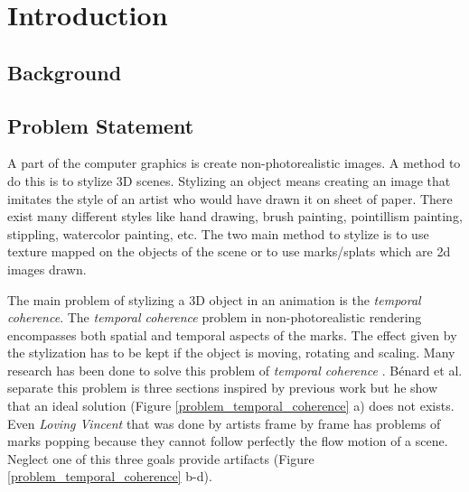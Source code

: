 \chapter{Introduction}


\section{Background}

\section{Problem Statement}

A part of the computer graphics is create non-photorealistic images. A method to do this is to stylize 3D scenes. Stylizing an object means creating an image that imitates the style of an artist who would have drawn it on sheet of paper. There exist many different styles like hand drawing, brush painting, pointillism painting, stippling, watercolor painting, etc. The two main method to stylize is to use texture mapped on the objects of the scene or to use marks/splats which are 2d images drawn.

The main problem of stylizing a 3D object in an animation is the \textit{temporal coherence}. The \textit{temporal coherence} problem in non-photorealistic rendering encompasses both spatial and temporal aspects of the marks. The effect given by the stylization has to be kept if the object is moving, rotating and scaling. Many research has been done to solve this problem of \textit{temporal coherence} \cite{vergne_implicit_2011, benard_dynamic_2009, bleron_motion-coherent_2018}. Bénard et al. separate this problem is three sections inspired by previous work\cite{meier_painterly_1996, cunzi_dynamic_nodate, breslav_dynamic_nodate, benard_state---art_2011} but he show that an ideal solution (Figure \ref{problem_temporal_coherence} a)  does not exists. Even \textit{Loving Vincent} \cite{LovingVincent} that was done by artists frame by frame has problems of marks popping because they cannot follow perfectly the flow motion of a scene. Neglect one of this three goals provide artifacts (Figure \ref{problem_temporal_coherence} b-d).

